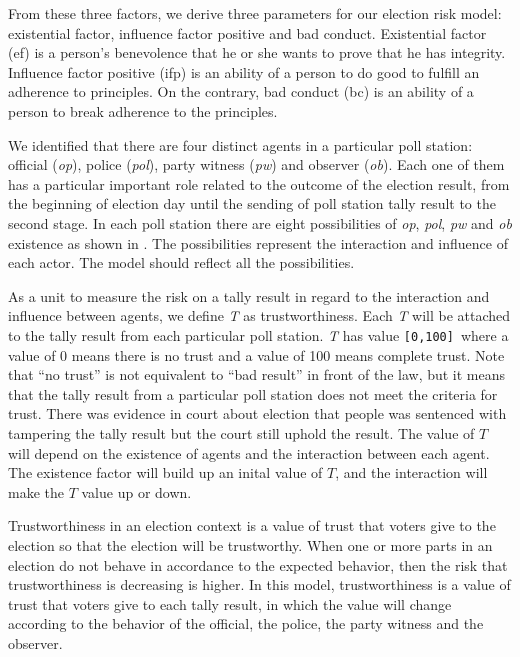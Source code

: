 \documentclass[JIP]{ipsj}
\def\|{\verb|}
\begin{document}
From these three factors, we derive three parameters for our election risk model: existential factor, influence factor positive and bad conduct. Existential factor (ef) is a person’s benevolence that he or she wants to prove that he has integrity. Influence factor positive (ifp) is an ability of a person to do good to fulfill an adherence to principles. On the contrary, bad conduct (bc) is an ability of a person to break adherence to the principles.

We identified that there are four distinct agents in a particular poll station: official (\textit{op}), police (\textit{pol}), party witness (\textit{pw}) and observer (\textit{ob}). Each one of them has a particular important role related to the outcome of the election result, from the beginning of election day until the sending of poll station tally result to the second stage. In each poll station there are eight possibilities of \textit{op}, \textit{pol}, \textit{pw} and \textit{ob} existence as shown in . The possibilities represent the interaction and influence of each actor. The model should reflect all the possibilities.

As a unit to measure the risk on a tally result in regard to the interaction and influence between agents, we define \textit{T} as trustworthiness. Each \textit{T} will be attached to the tally result from each particular poll station. \textit{T} has value \|[0,100]|\ where a value of 0 means there is no trust and a value of 100 means complete trust. Note that “no trust” is not equivalent to “bad result” in front of the law, but it means that the tally result from a particular poll station does not meet the criteria for trust. There was evidence in court about election that people was sentenced with tampering the tally result but the court still uphold the result. The value of $T$ will depend on the existence of agents and the interaction between each agent. The existence factor will build up an inital value of $T$, and the interaction will make the $T$ value up or down.

Trustworthiness in an election context is a value of trust that voters give to the election so that the election will be trustworthy. When one or more parts in an election do not behave in accordance to the expected behavior, then the risk that trustworthiness is decreasing is higher. In this model, trustworthiness is a value of trust that voters give to each tally result, in which the value will change according to the behavior of the official, the police, the party witness and the observer.
\end{document}
